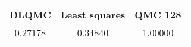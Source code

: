 \begin{tabular}{|c|c|c|}
\hline
DLQMC&Least squares&QMC 128\\ 
\hline

0.27178 & 0.34840 & 1.00000\\ 
\hline
\end{tabular}

